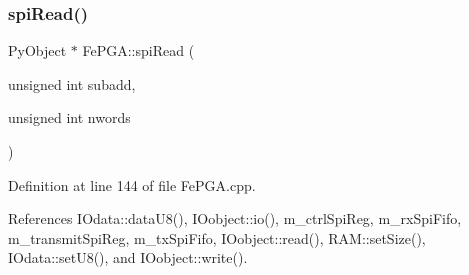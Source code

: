 \subsubsection{\texorpdfstring{spi\+Read()}{spiRead()}\hspace{0.1cm}{\footnotesize\ttfamily [2/3]}}
{\footnotesize\ttfamily Py\+Object $\ast$ Fe\+P\+G\+A\+::spi\+Read (\begin{DoxyParamCaption}\item[{unsigned int}]{subadd,  }\item[{unsigned int}]{nwords }\end{DoxyParamCaption})}



Definition at line 144 of file Fe\+P\+G\+A.\+cpp.



References I\+Odata\+::data\+U8(), I\+Oobject\+::io(), m\+\_\+ctrl\+Spi\+Reg, m\+\_\+rx\+Spi\+Fifo, m\+\_\+transmit\+Spi\+Reg, m\+\_\+tx\+Spi\+Fifo, I\+Oobject\+::read(), R\+A\+M\+::set\+Size(), I\+Odata\+::set\+U8(), and I\+Oobject\+::write().


